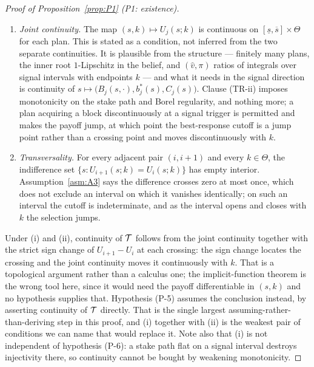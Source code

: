 \begin{proof}[Proof of Proposition~\ref{prop:P1} (P1: existence)]
\begin{enumerate}[label=(\roman*),leftmargin=2.4em,itemsep=3pt]
\item \emph{Joint continuity.} The map $(s,k) \mapsto U_j(s;k)$ is continuous on
  $[\underline s,\overline s] \times \Theta$ for each plan. This is stated as a condition, not
  inferred from the two separate continuities. It is plausible from the structure --- finitely many
  plans, the inner root $1$-Lipschitz in the belief, and $(\hat v,\pi)$ ratios of integrals over
  signal intervals with endpoints $k$ --- and what it needs in the signal direction is continuity of
  $s \mapsto \bigl(B_j(s,\cdot),b_j^*(s),C_j(s)\bigr)$. Clause (TR-ii) imposes monotonicity on the
  stake path and Borel regularity, and nothing more; a plan acquiring a block discontinuously at a
  signal trigger is permitted and makes the payoff jump, at which point the best-response cutoff is a
  jump point rather than a crossing point and moves discontinuously with $k$.
\item \emph{Transversality.} For every adjacent pair $(i,i+1)$ and every $k \in \Theta$, the
  indifference set $\{s : U_{i+1}(s;k) = U_i(s;k)\}$ has empty interior. Assumption~\ref{asm:A3} says
  the difference crosses zero at most once, which does not exclude an interval on which it vanishes
  identically; on such an interval the cutoff is indeterminate, and as the interval opens and closes
  with $k$ the selection jumps.
\end{enumerate}

Under (i) and (ii), continuity of $\mathcal{T}$ follows from the joint continuity together with the strict
sign change of $U_{i+1}-U_i$ at each crossing: the sign change locates the crossing and the joint
continuity moves it continuously with $k$. That is a topological argument rather than a calculus one;
the implicit-function theorem is the wrong tool here, since it would need the payoff differentiable
in $(s,k)$ and no hypothesis supplies that. Hypothesis (P-5) assumes the conclusion instead, by
asserting continuity of $\mathcal{T}$ directly. That is the single largest assuming-rather-than-deriving
step in this proof, and (i) together with (ii) is the weakest pair of conditions we can name that
would replace it. Note also that (i) is not independent of hypothesis (P-6): a stake path flat on a
signal interval destroys injectivity there, so continuity cannot be bought by weakening monotonicity.


\end{proof}
